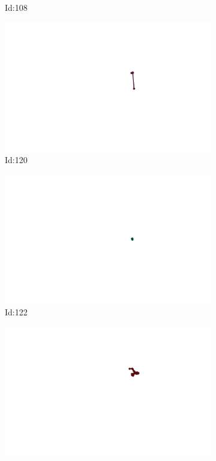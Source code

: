 \documentclass[12pt,twoside]{report}
\begin{document}
\begin{figure}
\begin{subfigure}[b]{0.20\textwidth}
\caption{Id:108}
\end{subfigure}
\begin{subfigure}[b]{0.20\textwidth}
\centering
\includegraphics[width=\textwidth]{../trajectories/120.png}
\caption{Id:120}
\end{subfigure}
\begin{subfigure}[b]{0.20\textwidth}
\centering
\includegraphics[width=\textwidth]{../trajectories/122.png}
\caption{Id:122}
\end{subfigure}
\begin{subfigure}[b]{0.20\textwidth}
\centering
\includegraphics[width=\textwidth]{../trajectories/124.png}

\end{subfigure}
\end{figure}
\end{document}
